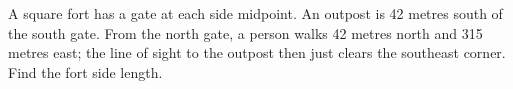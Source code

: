 A square fort has a gate at each side midpoint. An outpost is 42 metres south of the south gate. From the north gate, a person walks 42 metres north and 315 metres east; the line of sight to the outpost then just clears the southeast corner. Find the fort side length.
